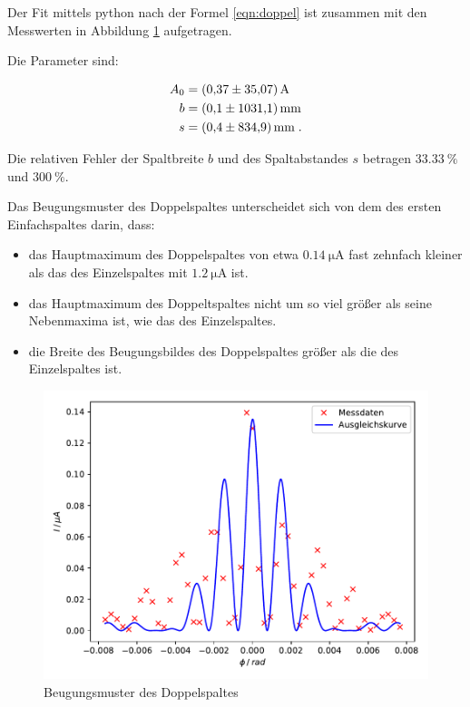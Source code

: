 Der Fit mittels python nach der Formel \eqref{eqn:doppel} ist zusammen mit den Messwerten in Abbildung
\ref{fig:plot3} aufgetragen.

Die Parameter sind:

\begin{align*}
    A_0 &= \SI{0.37 +- 35.07}{\ampere} \\
    b &= \SI{0.1 +- 1031.1}{\milli\meter} \\
    s &= \SI{0.4 +- 834.9}{\milli\meter} \; .
\end{align*}

Die relativen Fehler der Spaltbreite $b$ und des Spaltabstandes $s$ betragen $\SI{33.33}{\percent}$
und  $\SI{300}{\percent}$.

Das Beugungsmuster des Doppelspaltes unterscheidet sich von dem des ersten Einfachspaltes darin,
dass:

\begin{itemize}
    \item das Hauptmaximum des Doppelspaltes von etwa $\SI{0.14}{\micro\ampere}$ fast zehnfach
    kleiner als das des Einzelspaltes mit $\SI{1.2}{\micro\ampere}$ ist.
    \item das Hauptmaximum des Doppeltspaltes nicht um so viel größer als seine Nebenmaxima ist,
    wie das des Einzelspaltes.
    \item die Breite des Beugungsbildes des Doppelspaltes größer als die des Einzelspaltes ist.
\end{itemize}

\begin{figure}
    \centering
    \includegraphics{content/plot3.pdf}
    \caption{Beugungsmuster des Doppelspaltes}
    \label{fig:plot3}
  \end{figure}


